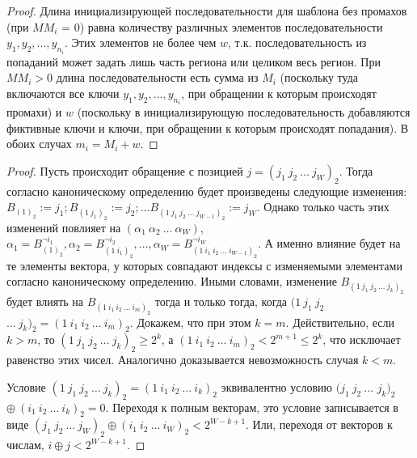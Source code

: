 \begin{proof}
  Длина инициализирующей последовательности для шаблона без промахов (при $MM_i$ = 0) равна количеству различных элементов последовательности $y_1, y_2, ..., y_{n_i}$. Этих элементов не более чем $w$,
  т.к. последовательность из попаданий может задать лишь часть региона
  или целиком весь регион. При $MM_i > 0$ длина последовательности
  есть сумма из $M_i$ (поскольку туда включаются все ключи $y_1, y_2,
  ..., y_{n_i}$, при обращении к которым происходят промахи) и
  $w$ (поскольку в инициализирующую последовательность добавляются фиктивные ключи и ключи, при обращении к которым происходят попадания). В обоих случах $m_i = M_i + w$.
\end{proof}

\theoremtext{\ref{thm_pseudoLRU_invariant}}{\PseudoLRUInvariant}
\begin{proof}
  Пусть происходит обращение с позицией $j = (j_1~j_2~\dots~j_W)_2$.
  Тогда согласно каноническому определению \PseudoLRU будет
  произведены следующие изменения: $B_{(1)_2} := j_1; B_{(1~j_1)_2} := j_2; \dots B_{(1~j_1~j_2~\dots~j_{W-1})_2} := j_W$. Однако только часть этих изменений повлияет на
  $(\alpha_1~\alpha_2~\dots~\alpha_W)$, $\alpha_1 = B_{(1)_2}^{\neg i_1}, \alpha_2 = B_{(1~i_1)_2}^{\neg i_2}, \dots, \alpha_W = B_{(1~i_1~i_2~\dots~i_{W-1})_2}^{\neg i_W}$. А именно влияние будет на те элементы вектора, у которых совпадают индексы с изменяемыми элементами согласно каноническому определению. Иными словами,
  изменение $B_{(1~j_1~j_2~\dots~j_k)_2}$ будет влиять на
  $B_{(1~i_1~i_2~\dots~i_m)_2}$ тогда и только тогда, когда
  $(1~j_1~j_2$ $\dots~j_k)_2 = (1~i_1~i_2~\dots~i_m)_2$. Докажем, что при этом $k = m$. Действительно, если $k > m$, то   $(1~j_1~j_2~\dots~j_k)_2 \geqslant 2^k$, а $(1~i_1~i_2~\dots~i_m)_2 < 2^{m+1} \leqslant 2^k$, что исключает равенство этих чисел.
  Аналогично доказывается невозможность случая $k < m$.

  Условие $(1~j_1~j_2~\dots~j_k)_2 = (1~i_1~i_2~\dots~i_k)_2$
  эквивалентно условию $(j_1~j_2~\dots$ $j_k)_2$ $\oplus~(i_1~i_2~\dots~i_k)_2 = 0$. Переходя к полным векторам, это условие записывается в виде $(j_1~j_2~\dots~j_W)_2 \oplus
  (i_1~i_2~\dots~i_W)_2 < 2^{W-k+1}$. Или, переходя от векторов к
  числам, $i \oplus j < 2^{W-k+1}$.


\end{proof}
